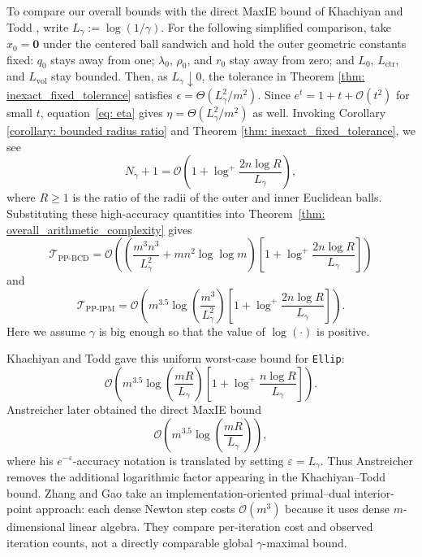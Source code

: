 \documentclass[smallextended]{svjour3}
\begin{document}
To compare our overall bounds with the direct MaxIE bound of Khachiyan and Todd
\cite{khachiyan1990complexity}, write $L_\gamma:=\log(1/\gamma)$.
For the following simplified comparison, take $x_0=\mathbf0$ under the centered
ball sandwich and hold the outer geometric constants fixed: $q_0$ stays away
from one; $\lambda_0$, $\rho_0$, and $r_0$ stay away from zero; and $L_0$,
$L_{\mathrm{ctr}}$, and $L_{\mathrm{vol}}$ stay bounded. Then, as
$L_\gamma\downarrow0$, the tolerance in Theorem
\ref{thm: inexact_fixed_tolerance} satisfies $ \epsilon=\Theta(L_\gamma^2/m^2).$
Since $e^t=1+t+\mathcal O(t^2)$ for small $t$, equation~\eqref{eq: eta} gives $\eta = \Theta(L_\gamma^2/m^2)$
as well. 
Invoking Corollary
\ref{corollary: bounded radius ratio} and Theorem
\ref{thm: inexact_fixed_tolerance}, we see
\[
    N_\gamma+1
    =\mathcal O\!\left(1+\log^+\!\frac{2n\log R}{L_\gamma}\right),
\]
where $R\geq1$ is the ratio of the radii of the outer and inner Euclidean balls.
Substituting these high-accuracy quantities into
Theorem~\ref{thm: overall_arithmetic_complexity} gives
\[
    \mathcal{T}_{\text{PP-BCD}}
    =\mathcal O\!\left(
      \left(\frac{m^3n^3}{L_\gamma^2}+mn^2\log\log m\right)
      \left[1+\log^+\!\frac{2n\log R}{L_\gamma}\right]
    \right)
\]
and
\[
    \mathcal{T}_{\text{PP-IPM}}
    =\mathcal O\!\left(
      m^{3.5}\log\!\left(\frac{m^3}{L_\gamma^2}\right)
      \left[1+\log^+\!\frac{2n\log R}{L_\gamma}\right]
    \right).
\]
Here we assume $\gamma$ is big enough so that the value of $\log(\cdot)$ is positive. 

Khachiyan and Todd \cite{khachiyan1990complexity} gave this uniform worst-case
bound for \texttt{Ellip}:
\[
    \mathcal O\!\left(
      m^{3.5}
      \log\left(\frac{mR}{L_\gamma}\right)
      \left[1+\log^+\!\frac{n\log R}{L_\gamma}\right]
    \right).
\]
Anstreicher \cite{anstreicher2002improved} later obtained the direct MaxIE bound
\[
    \mathcal O\!\left(
      m^{3.5}\log\left(\frac{mR}{L_\gamma}\right)
    \right),
\]
where his $e^{-\varepsilon}$-accuracy notation is translated by setting
$\varepsilon=L_\gamma$. Thus Anstreicher removes the additional logarithmic
factor appearing in the Khachiyan--Todd bound. Zhang and Gao
\cite{zhanggao2003mvie} take an implementation-oriented primal--dual
interior-point approach: each dense Newton step costs $\mathcal O(m^3)$ because
it uses dense $m$-dimensional linear algebra. They compare per-iteration cost
and observed iteration counts, not a directly comparable global
$\gamma$-maximal bound.
\end{document}
